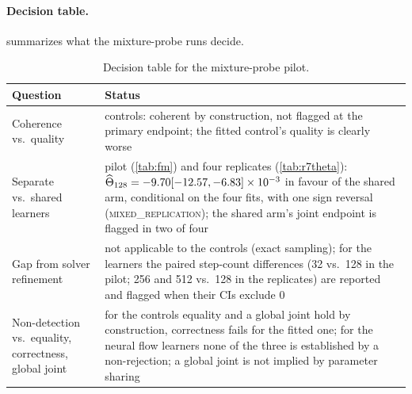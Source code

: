 \documentclass{article}
\theoremstyle{plain}
\theoremstyle{definition}
\theoremstyle{remark}
\begin{document}
\paragraph{Decision table.}
 summarizes what the mixture-probe runs decide.
\begin{table}[h]
\centering
\caption{Decision table for the mixture-probe pilot.}
\label{tab:decision}
\scriptsize
\setlength{\tabcolsep}{3pt}
\begin{tabular}{p{}p{}}
\toprule
Question & Status \\
\midrule
Coherence vs.\ quality & controls: coherent by construction, not flagged at the primary endpoint; the fitted control's quality is clearly worse \\
Separate vs.\ shared learners & pilot (\cref{tab:fm}) and four replicates (\cref{tab:r7theta}): $\widehat\Theta_{128}=-9.70 [-12.57, -6.83]\times10^{-3}$ in favour of the shared arm, conditional on the four fits, with one sign reversal (\textsc{mixed\_replication}); the shared arm's joint endpoint is flagged in two of four \\
Gap from solver refinement & not applicable to the controls (exact sampling); for the learners the paired step-count differences (32 vs.\ 128 in the pilot; 256 and 512 vs.\ 128 in the replicates) are reported and flagged when their CIs exclude $0$ \\
Non-detection vs.\ equality, correctness, global joint & for the controls equality and a global joint hold by construction, correctness fails for the fitted one; for the neural flow learners none of the three is established by a non-rejection; a global joint is not implied by parameter sharing \\
\bottomrule
\end{tabular}
\end{table}
\end{document}
